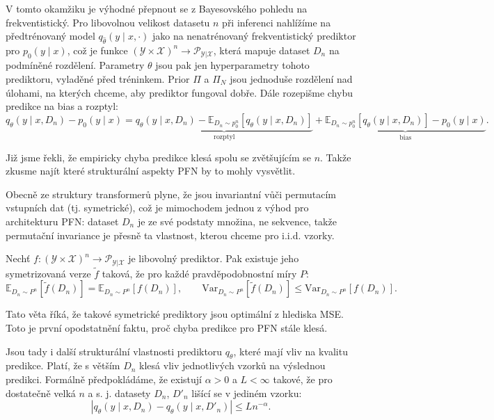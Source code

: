 V tomto okamžiku je výhodné přepnout se z Bayesovského pohledu na frekventistický.
Pro libovolnou velikost datasetu $n$ při inferenci nahlížíme na předtrénovaný model $q_{\hat\theta}(y \mid x, \cdot)$ jako na nenatrénovaný frekventistický prediktor pro $p_0(y \mid x)$, což je funkce $(\mathcal{Y} \times \mathcal{X})^n \to \mathcal{P}_{\mathcal{Y}|\mathcal{X}}$, která mapuje dataset $D_n$ na podmíněné rozdělení.
Parametry $\theta$ jsou pak jen hyperparametry tohoto prediktoru, vyladěné před tréninkem. 
Prior $\Pi$ a $\Pi_N$ jsou jednoduše rozdělení nad úlohami, na kterých chceme, aby prediktor fungoval dobře.
Dále rozepišme chybu predikce na bias a rozptyl:
\begin{equation}
    q_\theta(y \mid x, D_n) - p_0(y \mid x) = \underbrace{q_\theta(y \mid x, D_n) - \mathbb{E}_{D_n \sim p_0^n}[q_\theta(y \mid x, D_n)]}_{\text{rozptyl}} + \underbrace{\mathbb{E}_{D_n \sim p_0^n}[q_\theta(y \mid x, D_n)] - p_0(y \mid x)}_{\text{bias}}.
\label{Bias_Variance}
\end{equation}

Již jsme řekli, že empiricky chyba predikce klesá spolu se zvětšujícím se $n$.
Takže zkusme najít které strukturální aspekty PFN by to mohly vysvětlit.
\par 

Obecně ze struktury transformerů plyne, že jsou invariantní vůči permutacím vstupních dat (tj. symetrické), což je mimochodem jednou z výhod pro architekturu PFN: dataset $D_n$ je ze své podstaty množina, ne sekvence, takže permutační invariance je přesně ta vlastnost, kterou chceme pro i.i.d. vzorky.
\begin{theorem}
    Nechť $f : (\mathcal{Y} \times \mathcal{X})^n \to \mathcal{P}_{\mathcal{Y}|\mathcal{X}}$ je libovolný prediktor. Pak existuje jeho symetrizovaná verze $\tilde{f}$ taková, že pro každé pravděpodobnostní míry $P$:
\begin{equation}
    \mathbb{E}_{D_n \sim P^n}[\tilde{f}(D_n)] = \mathbb{E}_{D_n \sim P^n}[f(D_n)], \qquad \mathrm{Var}_{D_n \sim P^n}[\tilde{f}(D_n)] \leq \mathrm{Var}_{D_n \sim P^n}[f(D_n)].
\end{equation}
\label{theorem:symetrie_transformeru}
\end{theorem}
Tato věta říká, že takové symetrické prediktory jsou optimální z hlediska MSE.
Toto je první opodstatnění faktu, proč chyba predikce pro PFN stále klesá.
\par   

Jsou tady i další strukturální vlastnosti prediktoru $q_{\theta}$, které mají vliv na kvalitu predikce.
Platí, že s větším $D_n$ klesá vliv jednotlivých vzorků na výslednou predikci. 
Formálně předpokládáme, že existují $\alpha > 0$ a $L < \infty$ takové, že pro dostatečně velká $n$ a s. j. datasety $D_n$, $D'_n$ lišící se v jediném vzorku:
\begin{equation}
    \left| q_\theta(y \mid x, D_n) - q_\theta(y \mid x, D'_n) \right| \leq L n^{-\alpha}.
\label{eq:horní_mez_prediktoru}
\end{equation}


